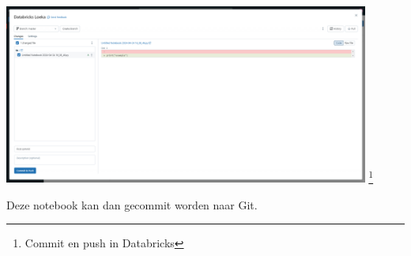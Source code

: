 \begin{center}
    \includegraphics[width=0.9\textwidth]{./graphics/databricks/git_4.png}
    \footnote{Commit en push in Databricks}
\end{center}

Deze notebook kan dan gecommit worden naar Git.



